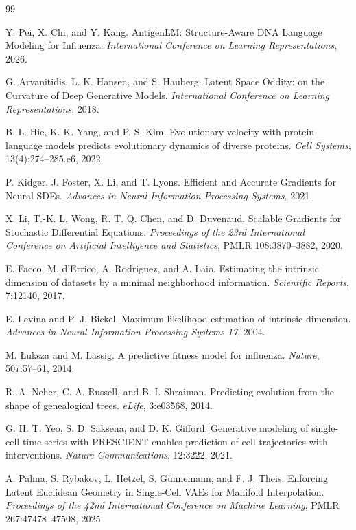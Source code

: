 \documentclass[12pt,letterpaper]{article}
\begin{document}
\begin{thebibliography}{99}

Y. Pei, X. Chi, and Y. Kang.
\newblock AntigenLM: Structure-Aware DNA Language Modeling for Influenza.
\newblock \emph{International Conference on Learning Representations}, 2026.

G. Arvanitidis, L. K. Hansen, and S. Hauberg.
\newblock Latent Space Oddity: on the Curvature of Deep Generative Models.
\newblock \emph{International Conference on Learning Representations}, 2018.

B. L. Hie, K. K. Yang, and P. S. Kim.
\newblock Evolutionary velocity with protein language models predicts evolutionary dynamics of diverse proteins.
\newblock \emph{Cell Systems}, 13(4):274--285.e6, 2022.

P. Kidger, J. Foster, X. Li, and T. Lyons.
\newblock Efficient and Accurate Gradients for Neural SDEs.
\newblock \emph{Advances in Neural Information Processing Systems}, 2021.

X. Li, T.-K. L. Wong, R. T. Q. Chen, and D. Duvenaud.
\newblock Scalable Gradients for Stochastic Differential Equations.
\newblock \emph{Proceedings of the 23rd International Conference on Artificial Intelligence and Statistics}, PMLR 108:3870--3882, 2020.

E. Facco, M. d'Errico, A. Rodriguez, and A. Laio.
\newblock Estimating the intrinsic dimension of datasets by a minimal neighborhood information.
\newblock \emph{Scientific Reports}, 7:12140, 2017.

E. Levina and P. J. Bickel.
\newblock Maximum likelihood estimation of intrinsic dimension.
\newblock \emph{Advances in Neural Information Processing Systems 17}, 2004.

M. \L{}uksza and M. L\"assig.
\newblock A predictive fitness model for influenza.
\newblock \emph{Nature}, 507:57--61, 2014.

R. A. Neher, C. A. Russell, and B. I. Shraiman.
\newblock Predicting evolution from the shape of genealogical trees.
\newblock \emph{eLife}, 3:e03568, 2014.

G. H. T. Yeo, S. D. Saksena, and D. K. Gifford.
\newblock Generative modeling of single-cell time series with PRESCIENT enables prediction of cell trajectories with interventions.
\newblock \emph{Nature Communications}, 12:3222, 2021.

A. Palma, S. Rybakov, L. Hetzel, S. G\"unnemann, and F. J. Theis.
\newblock Enforcing Latent Euclidean Geometry in Single-Cell VAEs for Manifold Interpolation.
\newblock \emph{Proceedings of the 42nd International Conference on Machine Learning}, PMLR 267:47478--47508, 2025.

\end{thebibliography}
\end{document}
